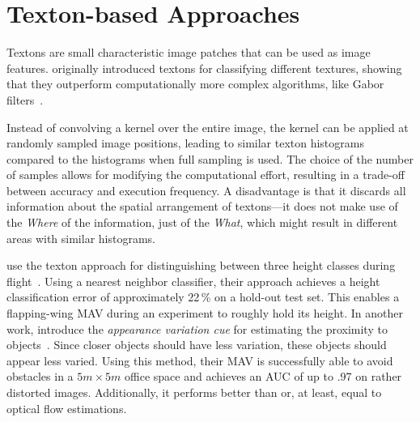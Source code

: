 \section{Texton-based Approaches}
\label{sec:textonbasedapproaches}

Textons are small characteristic image patches that can be used as image features.
\citeauthor{varma2005statistical} originally introduced textons for
classifying different textures, showing that they outperform
computationally more complex algorithms, like Gabor
filters~\cite{varma2005statistical}.

Instead of convolving a kernel over the entire image, the kernel can be applied at randomly sampled image positions, leading to similar texton histograms compared to the histograms when full sampling is used. The choice of the number of samples allows for modifying the computational effort, resulting in a
trade-off between accuracy and execution frequency. A disadvantage is
that it discards all information about the spatial arrangement of
textons---it does not make use of the \emph{Where} of the information,
just of the \emph{What}, which might result in different areas with
similar histograms.

\citeauthor{de2009design} use the texton approach for distinguishing
between three height classes during flight~\cite{de2009design}. Using
a nearest neighbor classifier, their approach achieves a height
classification error of approximately 22\,\% on a hold-out test set.
This enables a flapping-wing MAV during an experiment to roughly hold
its height. In another work, \citeauthor{de2012appearance} introduce
the \emph{appearance variation cue} for estimating the proximity to
objects~\cite{de2012appearance}. Since closer objects should have less
variation, these objects should appear less varied. Using this method,
their MAV is successfully able to avoid obstacles in a $5m \times 5m$
office space and achieves an AUC of up to .97 on rather distorted
images. Additionally, it performs better than or, at least, equal to
optical flow estimations.